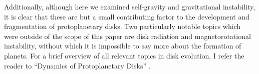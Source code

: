 \documentclass[aps,pra, twocolumn]{revtex4-1}
\begin{document}
Additionally, although here we examined self-gravity and gravitational instability, it is clear that these are but a small contributing factor to the development and fragmentation of protoplanetary disks.  Two particularly notable topics which were outside of the scope of this paper are disk radiation and magnetorotational instability, without which it is impossible to say more about the formation of planets.  For a brief overview of all relevant topics in disk evolution, I refer the reader to ``Dynamics of Protoplanetary Disks'' \cite{armitage2011}.


\end{document}

